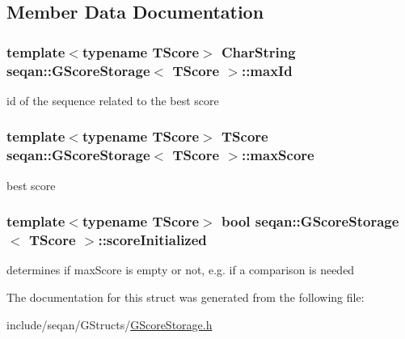 \subsection{Member Data Documentation}
\hypertarget{structseqan_1_1_g_score_storage_a264d4bc37f5c32b79a8fbbb5ffd24a4f}{
\subsubsection[{max\-Id}]{\setlength{\rightskip}{0pt plus 5cm}template$<$typename T\-Score$>$ Char\-String {\bf seqan\-::\-G\-Score\-Storage}$<$ T\-Score $>$\-::max\-Id}}\label{structseqan_1_1_g_score_storage_a264d4bc37f5c32b79a8fbbb5ffd24a4f}
id of the sequence related to the best score \hypertarget{structseqan_1_1_g_score_storage_a6473cc22038cb7f21df5866a6c452883}{
\subsubsection[{max\-Score}]{\setlength{\rightskip}{0pt plus 5cm}template$<$typename T\-Score$>$ T\-Score {\bf seqan\-::\-G\-Score\-Storage}$<$ T\-Score $>$\-::max\-Score}}\label{structseqan_1_1_g_score_storage_a6473cc22038cb7f21df5866a6c452883}
best score \hypertarget{structseqan_1_1_g_score_storage_a57225443721c66d5a3e5290775dd350c}{
\subsubsection[{score\-Initialized}]{\setlength{\rightskip}{0pt plus 5cm}template$<$typename T\-Score$>$ bool {\bf seqan\-::\-G\-Score\-Storage}$<$ T\-Score $>$\-::score\-Initialized}}\label{structseqan_1_1_g_score_storage_a57225443721c66d5a3e5290775dd350c}
determines if max\-Score is empty or not, e.\-g. if a comparison is needed 

The documentation for this struct was generated from the following file\-:\begin{DoxyCompactItemize}
\item 
include/seqan/\-G\-Structs/\hyperlink{_g_score_storage_8h}{G\-Score\-Storage.\-h}\end{DoxyCompactItemize}
